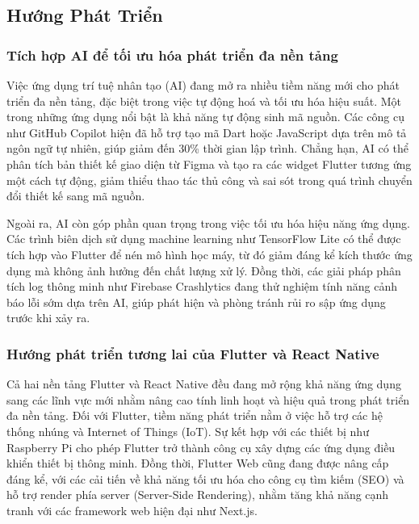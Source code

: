 \subsection{Hướng Phát Triển}

\subsubsection{Tích hợp AI để tối ưu hóa phát triển đa nền tảng}

\indent Việc ứng dụng trí tuệ nhân tạo (AI) đang mở ra nhiều tiềm năng mới cho phát triển đa nền tảng, đặc biệt trong việc tự động hoá và tối ưu hóa hiệu suất. Một trong những ứng dụng nổi bật là khả năng tự động sinh mã nguồn. Các công cụ như GitHub Copilot hiện đã hỗ trợ tạo mã Dart hoặc JavaScript dựa trên mô tả ngôn ngữ tự nhiên, giúp giảm đến 30\% thời gian lập trình. Chẳng hạn, AI có thể phân tích bản thiết kế giao diện từ Figma và tạo ra các widget Flutter tương ứng một cách tự động, giảm thiểu thao tác thủ công và sai sót trong quá trình chuyển đổi thiết kế sang mã nguồn.

\indent Ngoài ra, AI còn góp phần quan trọng trong việc tối ưu hóa hiệu năng ứng dụng. Các trình biên dịch sử dụng machine learning như TensorFlow Lite có thể được tích hợp vào Flutter để nén mô hình học máy, từ đó giảm đáng kể kích thước ứng dụng mà không ảnh hưởng đến chất lượng xử lý. Đồng thời, các giải pháp phân tích log thông minh như Firebase Crashlytics đang thử nghiệm tính năng cảnh báo lỗi sớm dựa trên AI, giúp phát hiện và phòng tránh rủi ro sập ứng dụng trước khi xảy ra.

\subsubsection{Hướng phát triển tương lai của Flutter và React Native}

\indent Cả hai nền tảng Flutter và React Native đều đang mở rộng khả năng ứng dụng sang các lĩnh vực mới nhằm nâng cao tính linh hoạt và hiệu quả trong phát triển đa nền tảng. Đối với Flutter, tiềm năng phát triển nằm ở việc hỗ trợ các hệ thống nhúng và Internet of Things (IoT). Sự kết hợp với các thiết bị như Raspberry Pi cho phép Flutter trở thành công cụ xây dựng các ứng dụng điều khiển thiết bị thông minh. Đồng thời, Flutter Web cũng đang được nâng cấp đáng kể, với các cải tiến về khả năng tối ưu hóa cho công cụ tìm kiếm (SEO) và hỗ trợ render phía server (Server-Side Rendering), nhằm tăng khả năng cạnh tranh với các framework web hiện đại như Next.js.

